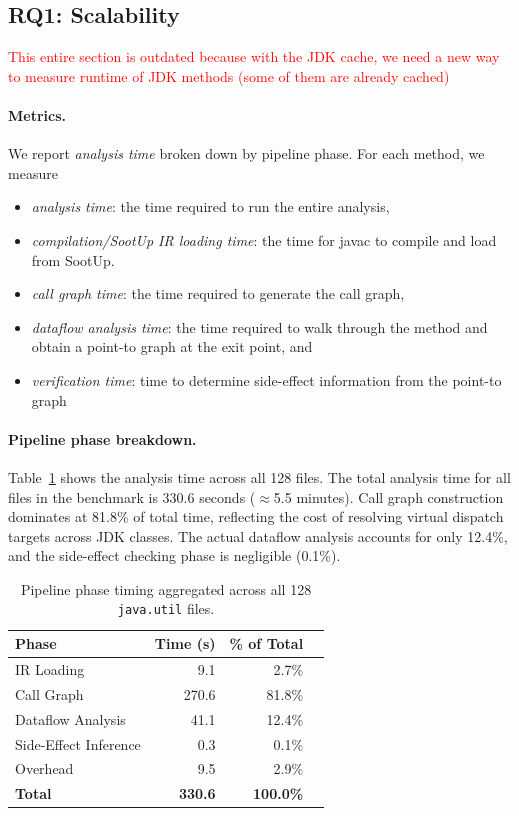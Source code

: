 \subsection{RQ1: Scalability}
\textcolor{red}{This entire section is outdated because with the JDK cache, we need a new way to measure runtime of JDK methods (some of them are already cached)}

\paragraph{Metrics.}
We report \emph{analysis time} broken down by pipeline phase. For each method, we measure
\begin{itemize}  
\item \textit{analysis time}: the time required to run the entire analysis, 
\item \textit{compilation/SootUp IR loading time}: the time for javac to compile and load from SootUp.  
\item \textit{call graph time}: the time required to generate the call graph,
\item \textit{dataflow analysis time}: the time required to walk through the method and obtain a point-to graph at the exit point, and
\item \textit{verification time}: time to determine side-effect information from the point-to graph 
\end{itemize}


\paragraph{Pipeline phase breakdown.}
Table~\ref{tab:pipeline} shows the analysis time across all 128 files.
The total analysis time for all files in the benchmark is 330.6 seconds ($\approx$5.5 minutes).
Call graph construction dominates at 81.8\% of total time, reflecting the cost of resolving virtual dispatch targets across JDK classes.
The actual dataflow analysis accounts for only 12.4\%, and the side-effect checking phase is negligible (0.1\%).

\begin{table}[h]
\centering
\caption{Pipeline phase timing aggregated across all 128 \texttt{java.util} files.}
\label{tab:pipeline}
\begin{tabular}{lrrr}
\toprule
\textbf{Phase} & \textbf{Time (s)} & \textbf{\% of Total} \\
\midrule
IR Loading          &    9.1 &  2.7\% \\
Call Graph          &  270.6 & 81.8\% \\
Dataflow Analysis   &   41.1 & 12.4\% \\
Side-Effect Inference   &    0.3 &  0.1\% \\
Overhead            &    9.5 &  2.9\% \\
\midrule
\textbf{Total}      & \textbf{330.6} & \textbf{100.0\%} \\
\bottomrule
\end{tabular}
\end{table}

